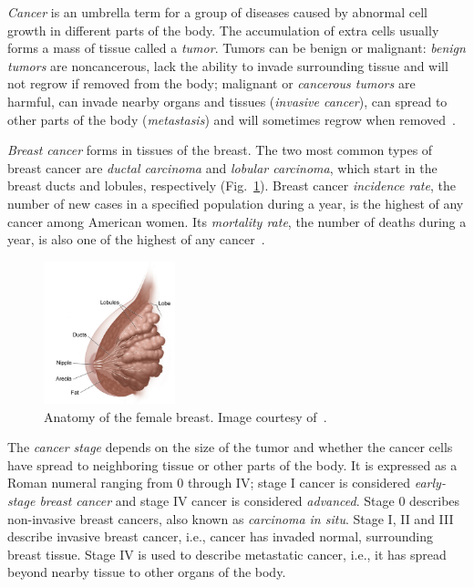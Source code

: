 \emph{Cancer} is an umbrella term for a group of diseases caused by abnormal cell growth in different parts of the body. The accumulation of extra cells usually forms a mass of tissue called a \emph{tumor}. Tumors can be benign or malignant: \emph{benign tumors} are noncancerous, lack the ability to invade surrounding tissue and will not regrow if removed from the body;  malignant or \emph{cancerous tumors} are harmful, can invade nearby organs and tissues (\emph{invasive cancer}), can spread to other parts of the body (\emph{metastasis}) and will sometimes regrow when removed~\cite{NCI2012}.

\emph{Breast cancer} forms in tissues of the breast. The two most common types of breast cancer are \emph{ductal carcinoma} and \emph{lobular carcinoma}, which start in the breast ducts and lobules, respectively (Fig.~\ref{fig:BreastAnatomy}). Breast cancer \emph{incidence rate}, the number of new cases in a specified population during a year, is the highest of any cancer among American women. Its \emph{mortality rate}, the number of deaths during a year, is also one of the highest of any cancer~\cite{Howlader2014}.

\begin{figure}[h]
	\centering
	\includegraphics[width = 0.34\textwidth]{plots/breastAnatomy.png}
	\caption[Anatomy of the female breast]{Anatomy of the female breast. Image courtesy of~\cite{NCI2012}.}
	\label{fig:BreastAnatomy}
\end{figure}

The \emph{cancer stage} depends on the size of the tumor and whether the cancer cells have spread to neighboring tissue or other parts of the body. It is expressed as a Roman numeral ranging from 0 through IV; stage I cancer is considered \emph{early-stage breast cancer} and stage IV cancer is considered \emph{advanced}. Stage 0 describes non-invasive breast cancers, also known as \emph{carcinoma in situ}. Stage I, II and III describe invasive breast cancer, i.e., cancer has invaded normal, surrounding breast tissue. Stage IV is used to describe metastatic cancer, i.e., it has spread beyond nearby tissue to other organs of the body.

